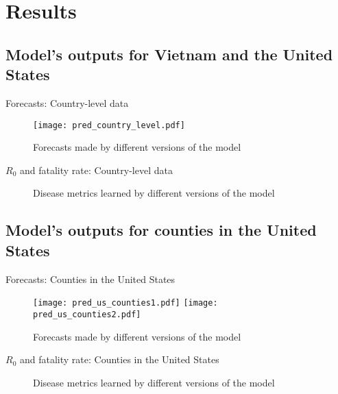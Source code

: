 \section{Results}

\subsection{Model's outputs for Vietnam and the United States}

\begin{frame}{Forecasts: Country-level data}
    \begin{figure}[!htb]
        \centering
        \texttt{[image: pred\_country\_level.pdf]}
        \caption{Forecasts made by different versions of the model}
    \end{figure}
\end{frame}

\begin{frame}{$R_0$ and fatality rate: Country-level data}
    \begin{figure}[!htb]
        \centering
        \caption{Disease metrics learned by different versions of the model}
    \end{figure}
\end{frame}

\subsection{Model's outputs for counties in the United States}

\begin{frame}{Forecasts: Counties in the United States}
    \begin{figure}[!htb]
        \centering
        \texttt{[image: pred\_us\_counties1.pdf]}
        \texttt{[image: pred\_us\_counties2.pdf]}
        \caption{Forecasts made by different versions of the model}
    \end{figure}
\end{frame}

\begin{frame}{$R_0$ and fatality rate: Counties in the United States}
    \begin{figure}[!htb]
        \centering
        \caption{Disease metrics learned by different versions of the model}
    \end{figure}
\end{frame}

